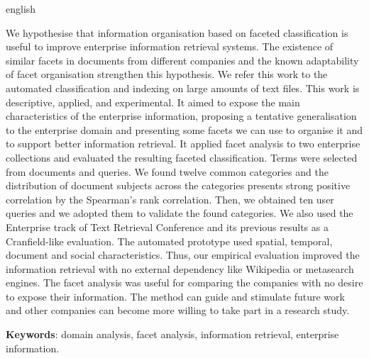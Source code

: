 \documentclass[
	11pt,				%
	openright,			%
	oneside,			%
	a4paper,			%
	english,			%
	french,				%
	spanish,			%
	brazil,				%
	]{abntex2}
\begin{document}
\begin{resumo}[Abstract]
 \begin{otherlanguage*}{english}

\noindent 
We hypothesise that information organisation based on faceted classification is useful to improve enterprise information retrieval systems. The existence of similar facets in documents from different companies and the known adaptability of facet organisation strengthen this hypothesis. We refer this work to the automated classification and indexing on large amounts of text files. This work is descriptive, applied, and experimental. It aimed to expose the main characteristics of the enterprise information, proposing a tentative generalisation to the enterprise domain and presenting some facets we can use to organise it and to support better information retrieval. It applied facet analysis to two enterprise collections and evaluated the resulting faceted classification. Terms were selected from documents and queries. We found twelve common categories and the distribution of document subjects across the categories presents strong positive correlation by the Spearman’s rank correlation. Then, we obtained ten user queries and we adopted them to validate the found categories. We also used the Enterprise track of Text Retrieval Conference and its previous results as a Cranfield-like evaluation. The automated prototype used spatial, temporal, document and social characteristics. Thus, our empirical evaluation improved the information retrieval with no external dependency like Wikipedia or metasearch engines. The facet analysis was useful for comparing the companies with no desire to expose their information. The method can guide and stimulate future work and other companies can become more willing to take part in a research study.

\noindent  
   \textbf{Keywords}: domain analysis, facet analysis, information retrieval, enterprise information.
 \end{otherlanguage*}
\end{resumo}


 \renewcommand*{\insertchapterspace}{} %

\listoffigures*
\cleardoublepage
\end{document}
